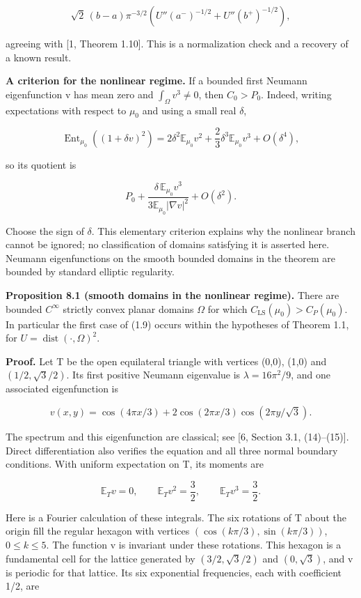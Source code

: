 \documentclass[11pt]{article}
\begin{document}
\[\sqrt2\,(b-a)\pi^{-3/2}
\left(U''(a^-)^{-1/2}+U''(b^+)^{-1/2}\right),\tag{8.1}\]

agreeing with {[}1, Theorem 1.10{]}. This is a normalization check and a
recovery of a known result.

\textbf{A criterion for the nonlinear regime.} If a bounded first
Neumann eigenfunction v has mean zero and \(\int _\Omega v^{3}\neq 0\),
then \(C_0>P_0\). Indeed, writing expectations with respect to
\(\mu _0\) and using a small real \(\delta\),

\[\operatorname{Ent}_{\mu_0}((1+\delta v)^2)
=2\delta^2\mathbb E_{\mu_0}v^2
+\frac23\delta^3\mathbb E_{\mu_0}v^3+O(\delta^4),\tag{8.2}\]

so its quotient is

\[P_0+\frac{\delta\,\mathbb E_{\mu_0}v^3}
{3\mathbb E_{\mu_0}|\nabla v|^2}+O(\delta^2).\tag{8.3}\]

Choose the sign of \(\delta\). This elementary criterion explains why
the nonlinear branch cannot be ignored; no classification of domains
satisfying it is asserted here. Neumann eigenfunctions on the smooth
bounded domains in the theorem are bounded by standard elliptic
regularity.

\textbf{Proposition 8.1 (smooth domains in the nonlinear regime).} There
are bounded \(C^{\infty}\) strictly convex planar domains \(\Omega\) for
which \(C_{\mathrm{LS}}(\mu _0)>C_P(\mu _0)\). In particular the first
case of (1.9) occurs within the hypotheses of Theorem 1.1, for
\(U=\operatorname{dist}(\cdot ,\Omega )^{2}\).

\textbf{Proof.} Let T be the open equilateral triangle with vertices
(0,0), (1,0) and \((1/2,\sqrt{3}/2)\). Its first positive Neumann
eigenvalue is \(\lambda =16\pi ^{2}/9\), and one associated
eigenfunction is

\[v(x,y)=\cos(4\pi x/3)+2\cos(2\pi x/3)\cos(2\pi y/\sqrt3).\tag{8.4}\]

The spectrum and this eigenfunction are classical; see {[}6, Section
3.1, (14)--(15){]}. Direct differentiation also verifies the equation
and all three normal boundary conditions. With uniform expectation on T,
its moments are

\[\mathbb E_Tv=0,\qquad \mathbb E_Tv^2=\frac32,
\qquad \mathbb E_Tv^3=\frac32.\tag{8.5}\]

Here is a Fourier calculation of these integrals. The six rotations of T
about the origin fill the regular hexagon with vertices
\((\cos (k\pi /3),\sin (k\pi /3))\), \(0\leq k\leq 5\). The function v
is invariant under these rotations. This hexagon is a fundamental cell
for the lattice generated by \((3/2,\sqrt{3}/2)\) and \((0,\sqrt{3})\),
and v is periodic for that lattice. Its six exponential frequencies,
each with coefficient 1/2, are
\end{document}
